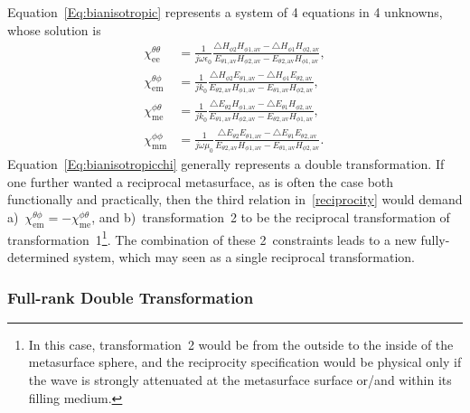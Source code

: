 \documentclass[journal,transaction]{IEEEtran}
\begin{document}
Equation~\eqref{Eq:bianisotropic} represents a system of 4 equations in 4 unknowns, whose solution is
%
\begin{subequations}\label{Eq:bianisotropicchi}
  \begin{align}
  \chi^{\theta \theta}_\text{ee} & =\frac{1}{j\omega\epsilon_0}\frac{\triangle H_{\phi2} H_{\phi1,\text{av}}-\triangle H_{\phi1} H_{\phi2,\text{av}}}{ E_{\theta1,\text{av}}H_{\phi2,\text{av}}-E_{\theta2,\text{av}}H_{\phi1,\text{av}}},\\
    \chi^{\theta \phi}_\text{em} & =\frac{1}{jk_0}\frac{\triangle H_{\phi2} E_{\theta1,\text{av}}-\triangle H_{\phi1} E_{\theta2,\text{av}}}{ E_{\theta2,\text{av}}H_{\phi1,\text{av}}-E_{\theta1,\text{av}}H_{\phi2,\text{av}}},\\
        \chi^{\phi \theta}_\text{me} & =\frac{1}{jk_0}\frac{\triangle E_{\theta2} H_{\phi1,\text{av}}-\triangle E_{\theta1} H_{\phi2,\text{av}}}{ E_{\theta1,\text{av}}H_{\phi2,\text{av}}-E_{\theta2,\text{av}}H_{\phi1,\text{av}}},\\
            \chi^{\phi \phi}_\text{mm} & =\frac{1}{j\omega\mu_0}\frac{\triangle E_{\theta2} E_{\theta1,\text{av}}-\triangle E_{\theta1} E_{\theta2,\text{av}}}{ E_{\theta2,\text{av}}H_{\phi1,\text{av}}-E_{\theta1,\text{av}}H_{\phi2,\text{av}}}.
\end{align}
\end{subequations}
%
Equation~\eqref{Eq:bianisotropicchi} generally represents a double transformation. If one further wanted a reciprocal metasurface, as is often the case both functionally and practically, then the third relation in~\eqref{reciprocity} would demand a)~$\chi^{\theta\phi}_\text{em}=-\chi^{\phi\theta}_\text{me}$, and b)~transformation~2 to be the reciprocal transformation of transformation~1\footnote{In this case, transformation~2 would be from the outside to the inside of the metasurface sphere, and the reciprocity specification would be physical only if the wave is strongly attenuated at the metasurface surface or/and within its filling medium.}. The combination of these 2~constraints leads to a new fully-determined system, which may seen as a single reciprocal transformation.

\subsubsection{Full-rank Double Transformation}
\end{document}
